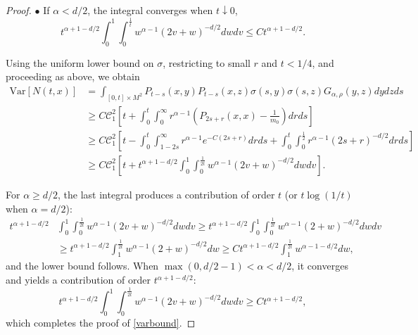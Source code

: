 \documentclass[12pt]{amsart}
\numberwithin{equation}{section}
\newcommand{\1}{\mathbf{1}}
\begin{document}
\begin{proof}
    $\bullet$ If $\alpha<d/2$, the integral converges when $t\downarrow0$,
    \begin{equation*}
        t^{\alpha+1-d/2}\int_0^1\int_0^{\frac{1}{t}}w^{\alpha-1}(2v+w)^{-d/2}dwdv \leq Ct^{\alpha+1-d/2}.
    \end{equation*}
    
Using the uniform lower bound on $\sigma$, restricting to small $r$ and $t<1/4$, and proceeding as above, we obtain
     \begin{equation*}
    \begin{split}
        \text{Var}[N(t,x)] &= \int_{[0,t]\times M^2}P_{t-s}(x,y)P_{t-s}(x,z)\sigma(s,y)\sigma(s,z)G_{\alpha,\rho}(y,z)dydzds\\
        &\geq C\mathcal{C}_1^2\left[t+\int_0^t\int_0^\infty r^{\alpha-1}\left(P_{2s+r}(x,x)-\frac{1}{m_0}\right)drds\right]\\
        &\geq C\mathcal{C}_1^2\left[t-\int_0^t\int_{1-2s}^\infty r^{\alpha-1}e^{-C(2s+r)}drds +\int_0^t\int_0^{\frac{1}{2}}r^{\alpha-1}(2s+r)^{-d/2}drds\right]\\
        & \geq C\mathcal{C}_1^2\left[t+t^{\alpha+1-d/2}\int_0^1\int_0^{\frac{1}{2t}}w^{\alpha-1}(2v+w)^{-d/2}dwdv \right].
    \end{split}
    \end{equation*}

    For $\alpha\ge d/2$, the last integral produces a contribution of order $t$ (or $t\log(1/t)$ when $\alpha=d/2$):
    \begin{equation*}
    \begin{split}
         t^{\alpha+1-d/2}&\int_0^1\int_0^{\frac{1}{2t}}w^{\alpha-1}(2v+w)^{-d/2}dwdv \geq t^{\alpha+1-d/2}\int_0^1\int_0^{\frac{1}{2t}}w^{\alpha-1}(2+w)^{-d/2}dwdv\\
         &\geq t^{\alpha+1-d/2}\int_{1}^{\frac{1}{2t}}w^{\alpha-1}(2+w)^{-d/2}dw\geq Ct^{\alpha+1-d/2}\int_{1}^{\frac{1}{2t}}w^{\alpha-1-d/2}dw,
    \end{split}
    \end{equation*}
    and the lower bound follows. When $\max(0,d/2-1)<\alpha<d/2$, it converges and yields a contribution of order $t^{\alpha+1-d/2}$:
    \begin{equation*}
        t^{\alpha+1-d/2}\int_0^1\int_0^{\frac{1}{2t}}w^{\alpha-1}(2v+w)^{-d/2}dwdv \geq Ct^{\alpha+1-d/2},
    \end{equation*}
    which completes the proof of \eqref{varbound}.


\end{proof}
\end{document}
